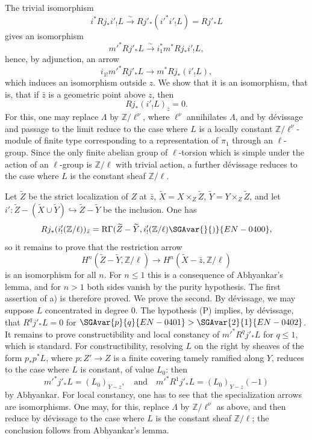 The trivial isomorphism
\[
i^*Rj_*i'_!L\xrightarrow{\sim}Rj'_*(i'^*i'_!L)=Rj'_*L
\]
gives an isomorphism
\[
m'^*Rj'_*L\xrightarrow{\sim} i_1^*m^*Rj_*i'_!L,
\]
hence, by adjunction, an arrow
\[
i_{1!}m'^*Rj'_*L\longrightarrow m^*Rj_*(i'_!L),
\]
which induces an isomorphism outside $z$. We show that it is an isomorphism, that is, that if $\bar z$ is a geometric point above $z$, then
\[
Rj_*(i'_!L)_{\bar z}=0.
\]
For this, one may replace $\Lambda$ by $\mathbb Z/\ell^\nu$, where $\ell^\nu$ annihilates $\Lambda$, and by dévissage and passage to the limit reduce to the case where $L$ is a locally constant $\mathbb Z/\ell^\nu$-module of finite type corresponding to a representation of $\pi_1$ through an $\ell$-group. Since the only finite abelian group of $\ell$-torsion which is simple under the action of an $\ell$-group is $\mathbb Z/\ell$ with trivial action, a further dévissage reduces to the case where $L$ is the constant sheaf $\mathbb Z/\ell$.

Let $\widetilde Z$ be the strict localization of $Z$ at $\bar z$, $\widetilde X=X\times_Z\widetilde Z$, $\widetilde Y=Y\times_Z\widetilde Z$, and let $i':\widetilde Z-(\widetilde X\cup\widetilde Y)\hookrightarrow \widetilde Z-\widetilde Y$ be the inclusion. One has
\[
Rj_*(i'_!(\mathbb Z/\ell))_{\bar z}
=\mathrm R\Gamma(\widetilde Z-\widetilde Y,i'_!(\mathbb Z/\ell)\SGAvar{}{)}{EN-0400},
\]
so it remains to prove that the restriction arrow
\[
H^n(\widetilde Z-\widetilde Y,\mathbb Z/\ell)
\longrightarrow
H^n(\widetilde X-\bar z,\mathbb Z/\ell)
\]
is an isomorphism for all $n$. For $n\le1$ this is a consequence of Abhyankar's lemma, and for $n>1$ both sides vanish by the purity hypothesis. The first assertion of a) is therefore proved. We prove the second. By dévissage, we may suppose $L$ concentrated in degree $0$. The hypothesis (P) implies, by dévissage, that $R^qj'_*L=0$ for $\SGAvar{p}{q}{EN-0401}>\SGAvar{2}{1}{EN-0402}$. It remains to prove constructibility and local constancy of $m'^*R^qj'_*L$ for $q\le1$, which is standard. For constructibility, resolving $L$ on the right by sheaves of the form $p_*p^*L$, where $p:Z'\to Z$ is a finite covering tamely ramified along $Y$, reduces to the case where $L$ is constant, of value $L_0$: then
\[
m'^*j'_*L=(L_0)_{Y-z},
\quad\text{and}\quad
m'^*R^1j'_*L=(L_0)_{Y-z}(-1)
\]
by Abhyankar. For local constancy, one has to see that the specialization arrows are isomorphisms. One may, for this, replace $\Lambda$ by $\mathbb Z/\ell^\nu$ as above, and then reduce by dévissage to the case where $L$ is the constant sheaf $\mathbb Z/\ell$; the conclusion follows from Abhyankar's lemma.

